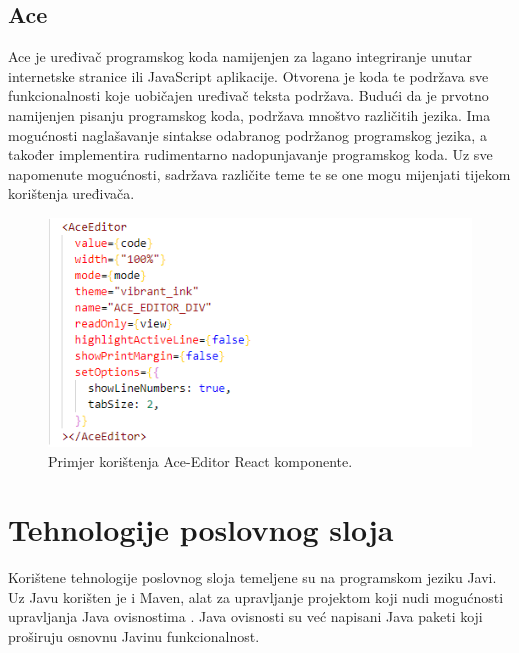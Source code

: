 \documentclass[times, utf8, zavrsni]{fer}
\begin{document}
			\subsection{Ace}
			Ace je uređivač programskog koda namijenjen za lagano integriranje unutar internetske stranice ili JavaScript aplikacije. Otvorena je koda te podržava sve funkcionalnosti koje uobičajen uređivač teksta podržava. Budući da je prvotno namijenjen pisanju programskog koda, podržava mnoštvo različitih jezika. Ima mogućnosti naglašavanje sintakse odabranog podržanog programskog jezika, a također implementira rudimentarno nadopunjavanje programskog koda. Uz sve napomenute mogućnosti, sadržava različite teme te se one mogu mijenjati tijekom korištenja uređivača.
			\begin{figure}[H]
				\centering
				\includegraphics[scale=0.75]{pictures/prikazi/AceEditor.png}
				\caption{Primjer korištenja Ace-Editor React komponente.}
				\label{fig:ace}
			\end{figure}
	
		\section{Tehnologije poslovnog sloja}
		Korištene tehnologije poslovnog sloja temeljene su na programskom jeziku Javi. Uz Javu korišten je i Maven, alat za upravljanje projektom koji nudi mogućnosti upravljanja Java ovisnostima . Java ovisnosti su već napisani Java paketi koji proširuju osnovnu Javinu funkcionalnost.
\end{document}
